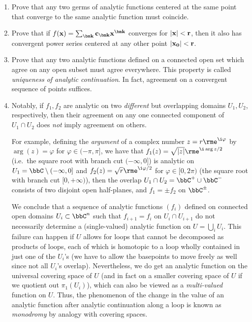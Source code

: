 \begin{xca}
    \begin{enumerate}
        \item Prove that any two germs of analytic functions centered at the same point that converge to the same analytic function must coincide.
        \item Prove that if $f(\bf{x})=\sum_{\bm k} c_{\bm k} {\bf x}^{\bm k}$ converges for $|\bf x|<r$, then it also has convergent power series centered at any other point $|\bf{x}_0|<r$.
        \item Prove that any two analytic functions defined on a connected open set which agree on any open subset must agree everywhere. This property is called \emph{uniqueness of analytic continuation}. In fact, agreement on a convergent sequence of points suffices.
        \item Notably, if $f_1,f_2$ are analytic on two \emph{different} but overlapping domains $U_1,U_2$, respectively, then their agreement on any one connected component of $U_1\cap U_2$ does \emph{not} imply agreement on others. 
        
        For example, defining the \emph{argument}  of a complex number $z=r\rme^{\i \varphi}$ by $\arg(z)=\varphi$ for $\varphi\in (-\pi,\pi]$, we have that $f_1(z)=\sqrt{|z|}\rme^{\i \arg z/2}$ (i.e.\ the square root with branch cut $(-\infty,0]$) is analytic on $U_1=\bbC\setminus (-\infty,0]$ and $f_2(z)=\sqrt{r}\rme^{\i \varphi/2}$ for $\varphi\in [0,2\pi)$ (the square root with branch cut $[0,+\infty)$), then the overlap $U_1\cap U_2=\bbC^+\cup \bbC^-$ consists of two disjoint open half-planes, and $f_1=\pm f_2$ on $\bbC^\pm$. 
        
        We conclude that a sequence of analytic functions $(f_i)$ defined on connected open domains $U_i\subset\bbC^n$ such that $f_{i+1}=f_i$ on $U_i\cap U_{i+1}$ do not necessarily determine a (single-valued) analytic function on $U=\bigcup_i U_i$. This failure can happen if $U$ allows for loops that cannot be decomposed as products of loops, each of which is homotopic to a loop wholly contained in just one of the $U_i$'s (we have to allow the basepoints to move freely as well since not all $U_i$'s overlap). Nevertheless, we do get an analytic function on the universal covering space of $U$ (and in fact on a smaller covering space of $U$ if we quotient out $\pi_1(U_i)$), which can also be viewed as a \emph{multi-valued} function on $U$. Thus, the phenomenon of the change in the value of an analytic function after analytic continuation along a loop is known as \emph{monodromy} by analogy with covering spaces.
    \end{enumerate}
\end{xca}

